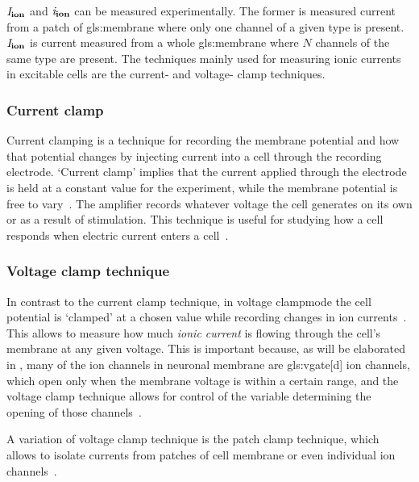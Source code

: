 \documentclass[class={myRUCProject}, crop=false]{standalone}
\begin{document}
\(\mathit{I}_\mathbf{ion}\) and \(\mathit{i}_\mathbf{ion}\) can be measured experimentally. 
The former is measured current from a patch of \gls{gls:membrane} where only one channel of a given type is present.
{}\(\mathit{I}_\mathbf{ion}\) is current measured from a whole \gls{gls:membrane} where \(N\) channels of the same type are present. The techniques mainly used for measuring ionic currents in excitable cells are the current- and voltage- clamp techniques.

\subsubsection{Current clamp}\label{sec:Cclamp}

Current clamping is a technique for recording the membrane potential and how that potential changes by injecting current into a cell through the recording electrode.  
`Current clamp' implies that the current applied through the electrode is held at a constant value for the experiment, while the membrane potential is free to vary~\cite{Hammond2015ch4}. The amplifier records whatever voltage the cell generates on its own or as a result of stimulation. 
This technique is useful for studying how a cell responds when electric current enters a cell~\cite{Hammond2015ch4}.

\subsubsection{Voltage clamp technique}\label{sec:Vclamp}
 
In contrast to the current clamp technique, in voltage clampmode the cell potential is `clamped' at a chosen value while recording changes in ion currents~\cite{Hammond2015ch4}. 
This allows to measure how much \textit{ionic current} is flowing through the cell's membrane at any given voltage. 
This is important because, as will be elaborated in , many of the ion channels in neuronal membrane are \gls{gls:vgate}[d] ion channels, which open only when the membrane voltage is within a certain range, and the voltage clamp technique allows for control of the variable determining the opening of those channels~\cite{Hammond2015ch4}.

A variation of  voltage clamp technique is the patch clamp technique, which allows to isolate currents from patches of cell membrane or even individual ion channels~\cite{Hammond2015ch4}.%
\end{document}
